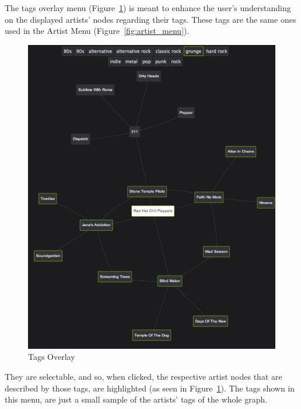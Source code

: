 \documentclass{article}
\begin{document}
      The tags overlay menu (Figure~\ref{fig:tags_overlay}) is meant to enhance the user’s understanding on the displayed artists’ nodes regarding their tags. These tags are the same ones used in the Artist Menu (Figure~\ref{fig:artist_menu}).
      \begin{figure}[th]
        \begin{center}
          \includegraphics[width=\columnwidth]{../report/figures/tags_overlay.pdf}
        \end{center}
        \caption{Tags Overlay}
        \label{fig:tags_overlay}
      \end{figure}
      They are selectable, and so, when clicked, the respective artist nodes that are described by those tags, are highlighted (as seen in Figure~\ref{fig:tags_overlay}).
      The tags shown in this menu, are just a small sample of the artists’ tags of the whole graph.








% 

\end{document}
